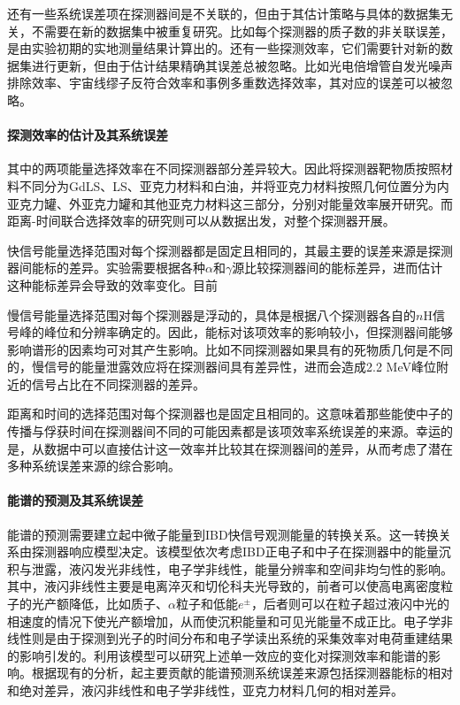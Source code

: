 \documentclass[a4paper,zihao=-4]{article}
\begin{document}
还有一些系统误差项在探测器间是不关联的，但由于其估计策略与具体的数据集无关，不需要在新的数据集中被重复研究。比如每个探测器的质子数的非关联误差，是由实验初期的实地测量结果计算出的。还有一些探测效率，它们需要针对新的数据集进行更新，但由于估计结果精确其误差总被忽略。比如光电倍增管自发光噪声排除效率、宇宙线缪子反符合效率和事例多重数选择效率，其对应的误差可以被忽略。

\paragraph{探测效率的估计及其系统误差}

其中的两项能量选择效率在不同探测器部分差异较大。因此将探测器靶物质按照材料不同分为GdLS、LS、亚克力材料和白油，并将亚克力材料按照几何位置分为内亚克力罐、外亚克力罐和其他亚克力材料这三部分，分别对能量效率展开研究。而距离-时间联合选择效率的研究则可以从数据出发，对整个探测器开展。

快信号能量选择范围对每个探测器都是固定且相同的，其最主要的误差来源是探测器间能标的差异。实验需要根据各种$\alpha$和$\gamma$源比较探测器间的能标差异，进而估计这种能标差异会导致的效率变化。目前

慢信号能量选择范围对每个探测器是浮动的，具体是根据八个探测器各自的$n$H信号峰的峰位和分辨率确定的。因此，能标对该项效率的影响较小，但探测器间能够影响谱形的因素均可对其产生影响。比如不同探测器如果具有的死物质几何是不同的，慢信号的能量泄露效应将在探测器间具有差异性，进而会造成2.2 MeV峰位附近的信号占比在不同探测器的差异。

距离和时间的选择范围对每个探测器也是固定且相同的。这意味着那些能使中子的传播与俘获时间在探测器间不同的可能因素都是该项效率系统误差的来源。幸运的是，从数据中可以直接估计这一效率并比较其在探测器间的差异，从而考虑了潜在多种系统误差来源的综合影响。

\paragraph{能谱的预测及其系统误差}
能谱的预测需要建立起中微子能量到IBD快信号观测能量的转换关系。这一转换关系由探测器响应模型决定。该模型依次考虑IBD正电子和中子在探测器中的能量沉积与泄露，液闪发光非线性，电子学非线性，能量分辨率和空间非均匀性的影响。其中，液闪非线性主要是电离淬灭和切伦科夫光导致的，前者可以使高电离密度粒子的光产额降低，比如质子、$\alpha$粒子和低能$e^\pm$，后者则可以在粒子超过液闪中光的相速度的情况下使光产额增加，从而使沉积能量和可见光能量不成正比。电子学非线性则是由于探测到光子的时间分布和电子学读出系统的采集效率对电荷重建结果的影响引发的。利用该模型可以研究上述单一效应的变化对探测效率和能谱的影响。根据现有的分析，起主要贡献的能谱预测系统误差来源包括探测器能标的相对和绝对差异，液闪非线性和电子学非线性，亚克力材料几何的相对差异。
\end{document}
